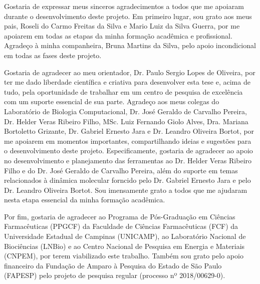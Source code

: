 \documentclass[Portugues]{phdquali}
\begin{document}

Gostaria de expressar meus sinceros agradecimentos a todos que me apoiaram durante o desenvolvimento deste projeto. Em primeiro lugar, sou grato aos meus pais, Roseli do Carmo Freitas da Silva e Mario Luiz da Silva Guerra, por me apoiarem em todas as etapas da minha formação acadêmica e profissional. Agradeço à minha companheira, Bruna Martins da Silva, pelo apoio incondicional em todas as fases deste projeto.

Gostaria de agradecer ao meu orientador, Dr. Paulo Sergio Lopes de Oliveira, por ter me dado liberdade científica e criativa para desenvolver esta tese e, acima de tudo, pela oportunidade de trabalhar em um centro de pesquisa de excelência com um suporte essencial de sua parte. Agradeço aos meus colegas do Laboratório de Biologia Computacional, Dr. José Geraldo de Carvalho Pereira, Dr. Helder Veras Ribeiro Filho, MSc. Luiz Fernando Giolo Alves, Dra. Mariana Bortoletto Grizante, Dr. Gabriel Ernesto Jara e Dr. Leandro Oliveira Bortot, por me apoiarem em momentos importantes, compartilhando ideias e sugestões para o desenvolvimento deste projeto. Especificamente, gostaria de agradecer ao apoio no desenvolvimento e planejamento das ferramentas ao Dr. Helder Veras Ribeiro Filho e do Dr. José Geraldo de Carvalho Pereira, além do suporte em temas relacionados à dinâmica molecular forncido pelo Dr. Gabriel Ernesto Jara e pelo Dr. Leandro Oliveira Bortot. Sou imensamente grato a todos que me ajudaram nesta etapa essencial da minha formação acadêmica.

Por fim, gostaria de agradecer ao Programa de Pós-Graduação em Ciências Farmacêuticas (PPGCF) da Faculdade de Ciências Farmacêuticas (FCF) da Universidade Estadual de Campinas (UNICAMP), ao Laboratório Nacional de Biociências (LNBio) e ao Centro Nacional de Pesquisa em Energia e Materiais (CNPEM), por terem viabilizado este trabalho. Também sou grato pelo apoio financeiro da Fundação de Amparo à Pesquisa do Estado de São Paulo (FAPESP) pelo projeto de pesquisa regular (processo nº 2018/00629-0).
\end{document}
